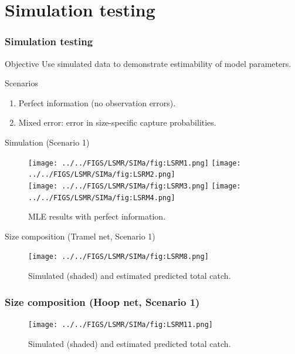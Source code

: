 \documentclass{beamer}
\begin{document}
\section{Simulation testing} %
\label{sec:simulation_testing}


\begin{frame}
	\frametitle{Simulation testing}
	\begin{block} {Objective}
		Use simulated data to demonstrate estimability of model parameters.
	\end{block}
	\begin{block}{Scenarios}
		\begin{enumerate}
			\item Perfect information (no observation errors).
			\item Mixed error: error in size-specific capture probabilities.
		\end{enumerate}
	\end{block}
\end{frame}

\begin{frame}{Simulation (Scenario 1)}
	\begin{figure}[htbp]
		\centering
			\texttt{[image: ../../FIGS/LSMR/SIMa/fig:LSRM1.png]}
			\texttt{[image: ../../FIGS/LSMR/SIMa/fig:LSRM2.png]}\\
			\texttt{[image: ../../FIGS/LSMR/SIMa/fig:LSRM3.png]}
			\texttt{[image: ../../FIGS/LSMR/SIMa/fig:LSRM4.png]}
		\caption{MLE results with perfect information.}
		\label{fig:FIGS_LSMR_SIMa_fig:LSRM1}
	\end{figure}
\end{frame}

\begin{frame}{Size composition (Tramel net, Scenario 1)}
	\only<1>
	{
		\begin{figure}[htbp]
			\centering
				\texttt{[image: ../../FIGS/LSMR/SIMa/fig:LSRM8.png]}
			\caption{Simulated (shaded) and estimated predicted total catch.}
			\label{fig:FIGS_LSMR_SIMa_fig:LSRM8}
		\end{figure}
	}
	{
	\frametitle{Size composition (Hoop net, Scenario 1)}
		\begin{figure}[htbp]
			\centering
				\texttt{[image: ../../FIGS/LSMR/SIMa/fig:LSRM11.png]}
			\caption{Simulated (shaded) and estimated predicted total catch.}
			\label{fig:FIGS_LSMR_SIMa_fig:LSRM11}
		\end{figure}
	}
	
\end{frame}
\end{document}
